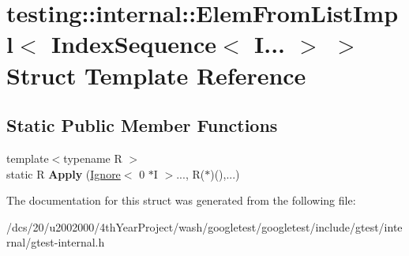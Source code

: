 \hypertarget{structtesting_1_1internal_1_1ElemFromListImpl_3_01IndexSequence_3_01I_8_8_8_01_4_01_4}{}\section{testing\+:\+:internal\+:\+:Elem\+From\+List\+Impl$<$ Index\+Sequence$<$ I... $>$ $>$ Struct Template Reference}
\label{structtesting_1_1internal_1_1ElemFromListImpl_3_01IndexSequence_3_01I_8_8_8_01_4_01_4}
\subsection*{Static Public Member Functions}
\begin{DoxyCompactItemize}
\item 
\mbox{\label{structtesting_1_1internal_1_1ElemFromListImpl_3_01IndexSequence_3_01I_8_8_8_01_4_01_4_a3eadad0251d2b3ea30322c3048cd61f1}} 
{\footnotesize template$<$typename R $>$ }\\static R {\bfseries Apply} (\mbox{\hyperlink{structtesting_1_1internal_1_1Ignore}{Ignore}}$<$ 0 $\ast$I $>$..., R($\ast$)(),...)
\end{DoxyCompactItemize}


The documentation for this struct was generated from the following file\+:\begin{DoxyCompactItemize}
\item 
/dcs/20/u2002000/4th\+Year\+Project/wash/googletest/googletest/include/gtest/internal/gtest-\/internal.\+h\end{DoxyCompactItemize}
